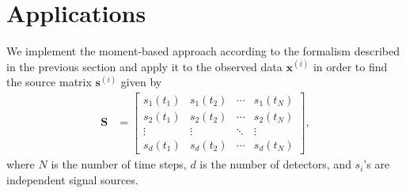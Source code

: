 \documentclass[aps,prl,preprint,superscriptaddress]{revtex4-2}
\begin{document}
\section{Applications}
We implement the moment-based approach according to the formalism described in the previous section and apply it to the observed data $\mathbf{x}^{(i)}$ in order to find the source matrix $\mathbf{s}^{(i)}$ given by
\begin{align}
\mathbf{S} &= \begin{bmatrix}
s_1(t_1) & s_1(t_2) & \cdots & s_1(t_N) \\
s_2(t_1) & s_2(t_2) & \cdots & s_2(t_N) \\
\vdots & \vdots & \ddots & \vdots \\
s_d(t_1) & s_d(t_2) & \cdots & s_d(t_N)
\end{bmatrix},
\end{align}
where $N$ is the number of time steps, $d$ is the number of detectors, and $s_i$'s are independent signal sources.
\end{document}
